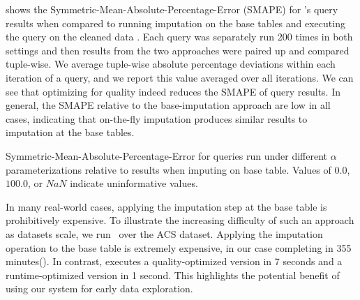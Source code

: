  shows the Symmetric-Mean-Absolute-Percentage-Error (SMAPE) for \ProjectName{}'s query results when compared to running imputation on the base tables and executing the query on the cleaned data .
Each query was separately run 200 times in both settings and then results from the two approaches were paired up and compared tuple-wise.
We average tuple-wise absolute percentage deviations within each iteration of a query, and we report this value averaged over all iterations.
We can see that optimizing for quality indeed reduces the SMAPE of query results.
In general, the SMAPE relative to the base-imputation approach are low in all cases, indicating that on-the-fly imputation produces similar results to imputation at the base tables.

\begin{table}
\centering

\caption{Symmetric-Mean-Absolute-Percentage-Error for queries run under different $\alpha$
    parameterizations relative to results when imputing on base table. Values of $0.0$,
    $100.0$, or $NaN$ indicate uninformative values.} %
\label{table:smape}
\end{table}

In many real-world cases, applying the imputation step at the base table is prohibitively
expensive.
To illustrate the increasing difficulty of such an approach as datasets scale, we run~ over the ACS dataset.
Applying the imputation operation to the base table is extremely expensive, in our case
completing in 355 minutes(). In contrast, \ProjectName{} executes a quality-optimized version
in 7 seconds and a runtime-optimized version in 1 second. This highlights the potential
benefit of using our system for early data exploration.


